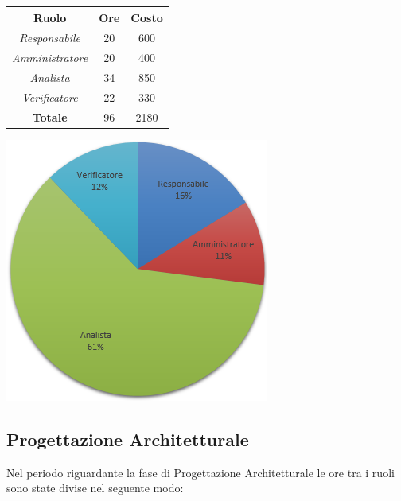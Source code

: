 \begin{center}
  \centering
  \begin{tabular}{|c|c|c|}
    \hline
    \textbf{Ruolo} & \textbf{Ore} & \textbf{Costo} \\
    \hline
     \emph{Responsabile}  & 20 & 600 \\
    \hline  \emph{Amministratore}  & 20 & 400 \\
    \hline  \emph{Analista}  & 34 & 850 \\
    \hline  \emph{Verificatore}  & 22 & 330 \\
    \hline
    \textbf{Totale} & 96 & 2180 \\
    \hline
  \end{tabular}
  \includegraphics[scale=0.7]{img/2-AnalisiDettaglio.png}
\end{center}

\subsection{Progettazione Architetturale}
Nel periodo riguardante la fase di Progettazione Architetturale le ore tra i ruoli sono state divise nel seguente modo: \\ \\

